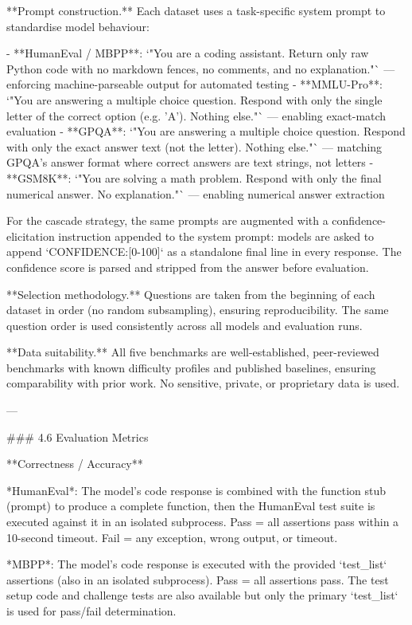 **Prompt construction.** Each dataset uses a task-specific system prompt to standardise model behaviour:

- **HumanEval / MBPP**: `"You are a coding assistant. Return only raw Python code with no markdown fences, no comments, and no explanation."` — enforcing machine-parseable output for automated testing
- **MMLU-Pro**: `"You are answering a multiple choice question. Respond with only the single letter of the correct option (e.g. 'A'). Nothing else."` — enabling exact-match evaluation
- **GPQA**: `"You are answering a multiple choice question. Respond with only the exact answer text (not the letter). Nothing else."` — matching GPQA's answer format where correct answers are text strings, not letters
- **GSM8K**: `"You are solving a math problem. Respond with only the final numerical answer. No explanation."` — enabling numerical answer extraction

For the cascade strategy, the same prompts are augmented with a confidence-elicitation instruction appended to the system prompt: models are asked to append `CONFIDENCE:[0-100]` as a standalone final line in every response. The confidence score is parsed and stripped from the answer before evaluation.

**Selection methodology.** Questions are taken from the beginning of each dataset in order (no random subsampling), ensuring reproducibility. The same question order is used consistently across all models and evaluation runs.

**Data suitability.** All five benchmarks are well-established, peer-reviewed benchmarks with known difficulty profiles and published baselines, ensuring comparability with prior work. No sensitive, private, or proprietary data is used.

---

### 4.6 Evaluation Metrics

**Correctness / Accuracy**

*HumanEval*: The model's code response is combined with the function stub (prompt) to produce a complete function, then the HumanEval test suite is executed against it in an isolated subprocess. Pass = all assertions pass within a 10-second timeout. Fail = any exception, wrong output, or timeout.

*MBPP*: The model's code response is executed with the provided `test_list` assertions (also in an isolated subprocess). Pass = all assertions pass. The test setup code and challenge tests are also available but only the primary `test_list` is used for pass/fail determination.

